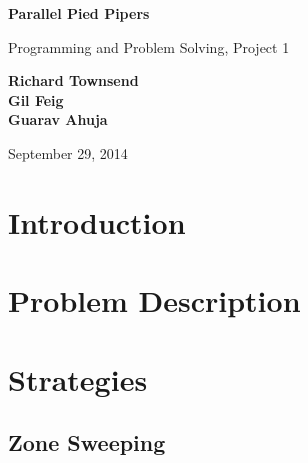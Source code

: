 \documentclass{article}
\begin{document}
\begin{titlepage}
\begin{center}

  \vspace*{1cm}

  \Huge
    \textbf{Parallel Pied Pipers}

  \vspace{0.5cm}
  \LARGE
    Programming and Problem Solving, Project 1

    \vspace{1.5cm}

  \textbf{Richard Townsend\\ Gil Feig\\ Guarav Ahuja}

  \vfill
    
    September 29, 2014
    \vspace{0.8cm}



\end{center}
\end{titlepage}


\tableofcontents

\newpage

\section{Introduction}

\section{Problem Description}

\section{Strategies}

\subsection{Zone Sweeping}
\end{document}
